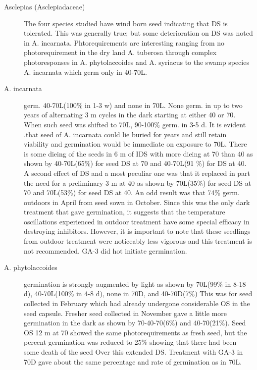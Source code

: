 \begin{description}
\item[Asclepias (Asclepiadaceae)] The four species studied have wind born
seed indicating that DS is tolerated. This was generally true; but some deterioration
on DS was noted in A. incarnata. Phtorequirements are interesting ranging from no
photorequirement in the dry land A. tuberosa through complex photoresponses in A.
phytolaccoides and A. syriacus to the swamp species A. incarnata which germ only in
40-70L.
\item[A. incarnata] germ. 40-70L(100\% in 1-3 w) and none in 70L. None germ. in up
to two years of alternating 3 m cycles in the dark starting at either 40 or 70. When such
seed was shifted to 70L, 90-100\% germ. in 3-5 d. It is evident .that seed of A. incarnata
could lie buried for years and still retain viability and germination would be immediate
on exposure to 70L. There is some dieing of the seeds in 6 m of IDS with more dieing
at 70 than 40 as shown by 40-70L(65\%) for seed DS at 70 and 40-70L(91 \%) for DS at
40. A second effect of DS and a most peculiar one was that it replaced in part the
need for a preliminary 3 m at 40 as shown by 70L(35\%) for seed DS at 70 and
70L(53\%) for seed DS at 40. An odd result was that 74\% germ. outdoors in April from
seed sown in October. Since this was the only dark treatment that gave germination, it
suggests that the temperature oscillations experienced in outdoor treatment have
some special efficacy in destroying inhibitors. However, it is important to note that
these seedlings from outdoor treatment were noticeably less vigorous and this
treatment is not recommended. GA-3 did hot initiate germination.
\item[A. phytolaccoides] germination is strongly augmented by light as shown by
70L(99\% in 8-18 d), 40-70L(100\% in 4-8 d), none in 70D, and 40-70D(7\%) This was
for seed collected in February which had already undergone considerable OS in the
seed capsule. Fresher seed collected in November gave a little more germination in
the dark as shown by 70-40-70(6\%) and 40-70(21\%). Seed OS 12 m at 70 showed
the same photorequirements as fresh seed, but the percent germination was reduced
to 25\% showing that there had been some death of the seed Over this extended DS.
Treatment with GA-3 in 70D gave about the same percentage and rate of germination
as in 70L.


\end{description}
